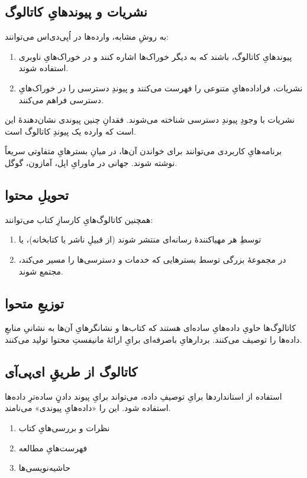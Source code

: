 \documentclass[]{article}
\begin{document}
\subsection{نشریات و پیوندهایِ کاتالوگ}
به روشِ مشابه، وارده‌ها در اُپی‌دی‌اس می‌توانند:
\begin{enumerate}
	\item پیوندهایِ کاتالوگ، باشند که به دیگر خوراک‌ها اشاره کنند و در خوراک‌هایِ ناوبری استفاده شوند.
	\item نشریات، فراداده‌هایِ متنوعی را فهرست می‌کنند و پیوندِ دسترسی را در خوراک‌هایِ دسترسی فراهم می‌کنند.
\end{enumerate}
نشریات با وجودِ پیوندِ دسترسی شناخته می‌شوند. فقدانِ چنین پیوندی نشان‌دهندهٔ این است که وارده یک پیوندِ کاتالوگ است.

برنامه‌هایِ کاربردی می‌توانند برای خواندن آن‌ها، در میانِ بسترهایِ متفاوتی سریعاً نوشته شوند. جهانی در ماورایِ اپل، آمازون، گوگل.
\subsection{تحویلِ محتوا}
همچنین کاتالوگ‌هایِ کارسازِ کتاب می‌توانند:
\begin{enumerate}
	\item توسطِ هر مهیاکنندهٔ رسانه‌ای منتشر شوند (از قبیلِ ناشر یا کتابخانه)، یا
	\item در مجموعهٔ بزرگی توسط بسترهایی که خدمات و دسترسی‌ها را مسیر می‌کند، مجتمع شوند.
\end{enumerate}

\subsection{توزیعِ متحوا}
کاتالوگ‌ها حاویِ داده‌هایِ ساده‌ای هستند که کتاب‌ها و نشانگرهایِ آن‌ها به نشانیِ منابعِ داده‌ها را توصیف می‌کنند. بردارهایِ باصرفه‌ای برایِ ارائهٔ مانیفستِ محتوا تولید می‌کنند.

\subsection{کاتالوگ از طریقِ ای‌پی‌آی}
استفاده از استانداردها برایِ توصیفِ داده، می‌تواند برایِ پیوند دادنِِ ساده‌ترِ داده‌ها استفاده شود. این را «داده‌هایِ پیوندی» می‌نامند.
\begin{enumerate}
	\item نظرات و بررسی‌هایِ کتاب
	\item فهرست‌هایِ مطالعه
	\item حاشیه‌نویسی‌ها
\end{enumerate}
\end{document}
